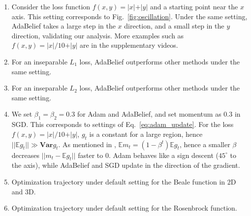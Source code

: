 \documentclass{article}
\begin{document}
\begin{enumerate}[topsep=0pt,parsep=0pt,partopsep=0pt, noitemsep,nolistsep]
    \item[(a)] Consider the loss function $f(x,y)=\vert x \vert + \vert y \vert$ and a starting point near the $x$ axis. This setting corresponds to Fig.~\ref{fig:oscillation}. Under the same setting, AdaBelief takes a large step in the $x$ direction, and a small step in the $y$ direction, validating our analysis. More examples such as $f(x,y)=\vert x \vert/10 + \vert y \vert$ are in the supplementary videos.
    \item[(b)]
    For an inseparable $L_1$ loss, AdaBelief outperforms other methods under the same setting.
    \item[(c)] For an inseparable $L_2$ loss, AdaBelief outperforms other methods under the same setting.
    \item[(d)] We set $\beta_1=\beta_2 = 0.3$ for Adam and AdaBelief, and set momentum as $0.3$ in SGD. This corresponds to settings of Eq.~\ref{eq:adam_update}.
    For the loss $f(x,y) = \vert x \vert/10 + \vert y \vert$, $g_t$ is a constant for a large region, hence $\vert \vert\mathbb{E}g_t \vert \vert \gg \mathbf{Var}g_t$. As mentioned in \cite{kingma2014adam}, $\mathbb{E} m_t = (1- \beta^t) \mathbb{E} g_t$, hence a smaller $\beta$ decreases $\vert \vert m_t - \mathbb{E}g_t \vert \vert$ faster to 0. Adam behaves like a sign descent ($45^\circ$ to the axis), while AdaBelief and SGD update in the direction of the gradient.%
    \item[(e)-(f)] Optimization trajectory under default setting for the Beale \cite{beale1955minimizing} function in 2D and 3D.
    \item[(g)-(h)] Optimization trajectory under default setting for the Rosenbrock \cite{rosenbrock1960automatic} function. %
\end{enumerate}
\end{document}
